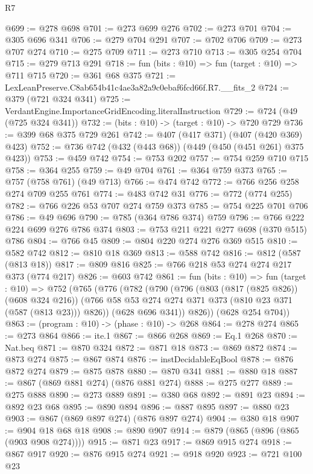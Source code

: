 \begin{lexlean}{R7}
\begin{coremodule}
@699 := @278 @698
@701 := @273 @699 @276
@702 := @273 @701
@704 := @305 @696 @341
@706 := @279 @704 @291
@707 := @702 @706
@709 := @273 @707 @274
@710 := @275 @709
@711 := @273 @710
@713 := @305 @254 @704
@715 := @279 @713 @291
@718 := fun (bits : @10) => fun (target : @10) => @711 @715
@720 := @361 @68 @375
@721 := LexLeanPreserve.C8ab654b41c4ae3a82a9c0ebaf6fcd66f.R7.__fits_2
@724 := @379 (@721 @324 @341)
@725 := VerdantEngine.ImportanceGridEncoding.literalInstruction
@729 := @724 (@49 (@725 @324 @341))
@732 := (bits : @10) -> (target : @10) -> @720 @729
@736 := @399 @68 @375 @729 @261
@742 := @407 (@417 @371) (@407 (@420 @369) @423)
@752 := @736 @742 (@432 (@443 @68)) (@449 (@450 (@451 @261) @375 @423))
@753 := @459 @742
@754 := @753 @202
@757 := @754 @259 @710 @715
@758 := @364 @255
@759 := @49 @704
@761 := @364 @759 @373
@765 := @757 (@758 @761) (@49 @713)
@766 := @474 @742
@772 := @766 @256 @258 @274 @709 @255 @761
@774 := @483 @742 @31
@776 := @772 (@774 @255)
@782 := @766 @226 @53 @707 @274 @759 @373
@785 := @754 @225 @701 @706
@786 := @49 @696
@790 := @785 (@364 @786 @374) @759
@796 := @766 @222 @224 @699 @276 @786 @374
@803 := @753 @211 @221 @277 @698 (@370 @515) @786
@804 := @766 @45
@809 := @804 @220 @274 @276 @369 @515
@810 := @582 @742
@812 := @810 @18 @369
@813 := @588 @742
@816 := @812 (@587 (@813 @18))
@817 := @809 @816
@825 := @766 @218 @53 @274 @274 @217 @373 (@774 @217)
@826 := @603 @742
@861 := fun (bits : @10) =>
  fun (target : @10) =>
  @752
    (@765
      (@776
        (@782
          (@790
            (@796
              (@803 (@817 (@825 @826)) (@608 @324 @216))
              (@766 @58 @53 @274 @274 @371 @373 (@810 @23 @371 (@587 (@813 @23))) @826))
            (@628 @696 @341))
          @826))
      (@628 @254 @704))
@863 := (program : @10) -> (phase : @10) -> @268
@864 := @278 @274
@865 := @273 @864
@866 := ite.{1}
@867 := @866 @268
@869 := Eq.{1} @268
@870 := Nat.beq
@871 := @870 @324
@872 := @871 @18
@873 := @869 @872
@874 := @873 @274
@875 := @867 @874
@876 := instDecidableEqBool
@878 := @876 @872 @274
@879 := @875 @878
@880 := @870 @341
@881 := @880 @18
@887 := @867 (@869 @881 @274) (@876 @881 @274)
@888 := @275 @277
@889 := @275 @888
@890 := @273 @889
@891 := @380 @68
@892 := @891 @23
@894 := @892 @23 @68
@895 := @890 @894
@896 := @887 @895
@897 := @880 @23
@903 := @867 (@869 @897 @274) (@876 @897 @274)
@904 := @380 @18
@907 := @904 @18 @68 @18
@908 := @890 @907
@914 := @879 (@865 (@896 (@865 (@903 @908 @274))))
@915 := @871 @23
@917 := @869 @915 @274
@918 := @867 @917
@920 := @876 @915 @274
@921 := @918 @920
@923 := @721 @100 @23

\end{coremodule}
\end{lexlean}
